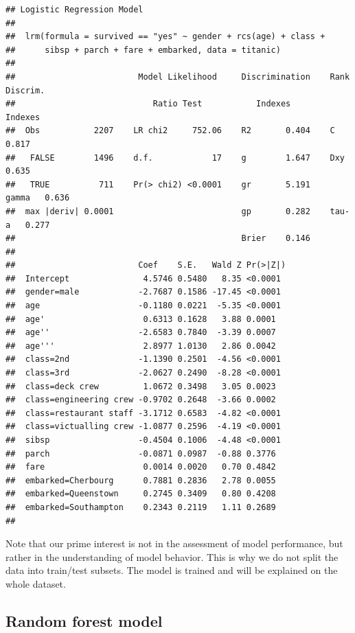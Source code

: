 \documentclass[]{krantz}
\begin{document}
\begin{verbatim}
## Logistic Regression Model
##  
##  lrm(formula = survived == "yes" ~ gender + rcs(age) + class + 
##      sibsp + parch + fare + embarked, data = titanic)
##  
##                         Model Likelihood     Discrimination    Rank Discrim.    
##                            Ratio Test           Indexes           Indexes       
##  Obs           2207    LR chi2     752.06    R2       0.404    C       0.817    
##   FALSE        1496    d.f.            17    g        1.647    Dxy     0.635    
##   TRUE          711    Pr(> chi2) <0.0001    gr       5.191    gamma   0.636    
##  max |deriv| 0.0001                          gp       0.282    tau-a   0.277    
##                                              Brier    0.146                     
##  
##                         Coef    S.E.   Wald Z Pr(>|Z|)
##  Intercept               4.5746 0.5480   8.35 <0.0001 
##  gender=male            -2.7687 0.1586 -17.45 <0.0001 
##  age                    -0.1180 0.0221  -5.35 <0.0001 
##  age'                    0.6313 0.1628   3.88 0.0001  
##  age''                  -2.6583 0.7840  -3.39 0.0007  
##  age'''                  2.8977 1.0130   2.86 0.0042  
##  class=2nd              -1.1390 0.2501  -4.56 <0.0001 
##  class=3rd              -2.0627 0.2490  -8.28 <0.0001 
##  class=deck crew         1.0672 0.3498   3.05 0.0023  
##  class=engineering crew -0.9702 0.2648  -3.66 0.0002  
##  class=restaurant staff -3.1712 0.6583  -4.82 <0.0001 
##  class=victualling crew -1.0877 0.2596  -4.19 <0.0001 
##  sibsp                  -0.4504 0.1006  -4.48 <0.0001 
##  parch                  -0.0871 0.0987  -0.88 0.3776  
##  fare                    0.0014 0.0020   0.70 0.4842  
##  embarked=Cherbourg      0.7881 0.2836   2.78 0.0055  
##  embarked=Queenstown     0.2745 0.3409   0.80 0.4208  
##  embarked=Southampton    0.2343 0.2119   1.11 0.2689  
## 
\end{verbatim}

Note that our prime interest is not in the assessment of model performance, but rather in the understanding of model behavior. This is why we do not split the data into train/test subsets. The model is trained and will be explained on the whole dataset.

\hypertarget{model-titanic-rf}{%
\subsection{Random forest model}\label{model-titanic-rf}}
\end{document}
